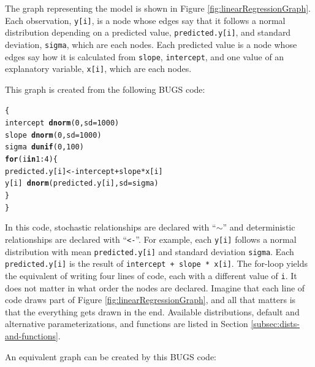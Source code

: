 \documentclass[12pt,oneside]{book}\usepackage[]{graphicx}\usepackage[]{color}
\makeatletter
\newcommand{\hlnum}[1]{\textcolor[rgb]{0.686,0.059,0.569}{#1}}%
\newcommand{\hlopt}[1]{\textcolor[rgb]{0,0,0}{#1}}%
\newcommand{\hlstd}[1]{\textcolor[rgb]{0.345,0.345,0.345}{#1}}%
\newcommand{\hlkwa}[1]{\textcolor[rgb]{0.161,0.373,0.58}{\textbf{#1}}}%
\newcommand{\hlkwb}[1]{\textcolor[rgb]{0.69,0.353,0.396}{#1}}%
\newcommand{\hlkwc}[1]{\textcolor[rgb]{0.333,0.667,0.333}{#1}}%
\newcommand{\hlkwd}[1]{\textcolor[rgb]{0.737,0.353,0.396}{\textbf{#1}}}%
\newenvironment{kframe}{%
 \def\at@end@of@kframe{}%
 \ifinner\ifhmode%
  \def\at@end@of@kframe{\end{minipage}}%
  \begin{minipage}{\columnwidth}%
 \fi\fi%
 \def\FrameCommand##1{\hskip\@totalleftmargin \hskip-\fboxsep
 \colorbox{shadecolor}{##1}\hskip-\fboxsep
     \hskip-\linewidth \hskip-\@totalleftmargin \hskip\columnwidth}%
 \MakeFramed {\advance\hsize-\width
   \@totalleftmargin\z@ \linewidth\hsize
   \@setminipage}}%
 {\par\unskip\endMakeFramed%
 \at@end@of@kframe}
\newenvironment{knitrout}{}{} %
\def\cd#1{\texttt{#1}}
\makeatother
\begin{document}
The graph representing the model is 
shown in Figure \ref{fig:linearRegressionGraph}.  Each observation,
\cd{y[i]}, is a node whose edges say that it follows a normal
distribution depending on a predicted value, \cd{predicted.y[i]}, and
standard deviation, \cd{sigma}, which are each nodes.  Each predicted
value is a node whose edges say how it is calculated from \cd{slope},
\cd{intercept}, and one value of an explanatory variable, \cd{x[i]},
which are each nodes.

This graph is created from the following BUGS code:

\begin{knitrout}
\color{fgcolor}\begin{kframe}
\begin{alltt}
\hlstd{\{}
    \hlstd{intercept} \hlopt{~} \hlkwd{dnorm}\hlstd{(}\hlnum{0}\hlstd{,} \hlkwc{sd} \hlstd{=} \hlnum{1000}\hlstd{)}
    \hlstd{slope} \hlopt{~} \hlkwd{dnorm}\hlstd{(}\hlnum{0}\hlstd{,} \hlkwc{sd} \hlstd{=} \hlnum{1000}\hlstd{)}
    \hlstd{sigma} \hlopt{~} \hlkwd{dunif}\hlstd{(}\hlnum{0}\hlstd{,} \hlnum{100}\hlstd{)}
    \hlkwa{for}\hlstd{(i} \hlkwa{in} \hlnum{1}\hlopt{:}\hlnum{4}\hlstd{) \{}
        \hlstd{predicted.y[i]} \hlkwb{<-} \hlstd{intercept} \hlopt{+} \hlstd{slope} \hlopt{*} \hlstd{x[i]}
        \hlstd{y[i]} \hlopt{~} \hlkwd{dnorm}\hlstd{(predicted.y[i],} \hlkwc{sd} \hlstd{= sigma)}
    \hlstd{\}}
\hlstd{\}}
\end{alltt}
\end{kframe}
\end{knitrout}

In this code, stochastic relationships are declared with ``$\sim$''
and deterministic relationships are declared with ``\cd{<-}''.  For
example, each \cd{y[i]} follows a normal distribution with mean
\cd{predicted.y[i]} and standard deviation
\cd{sigma}.  Each
\cd{predicted.y[i]} is the result of \cd{intercept + slope * x[i]}.
The for-loop yields the equivalent of writing four lines of code, each
with a different value of \cd{i}.  It does not matter in what order
the nodes are declared.  Imagine that each line of code draws part of
Figure \ref{fig:linearRegressionGraph}, and all that matters is that
the everything gets drawn in the end.  Available distributions, default and alternative
  parameterizations, and functions are listed in Section \ref{subsec:dists-and-functions}.

An equivalent graph can be created by this BUGS code:
\end{document}
